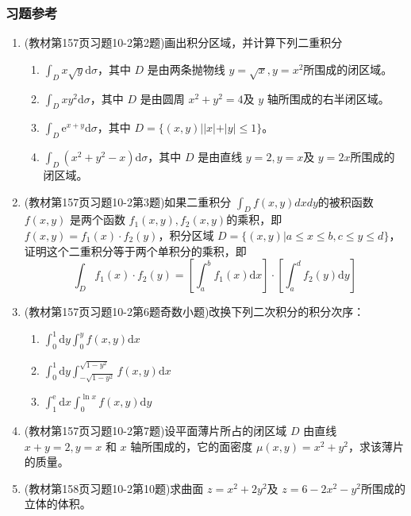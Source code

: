 \subsubsection{习题参考}
\begin{enumerate}
    \item (教材第157页习题10-2第2题)画出积分区域，并计算下列二重积分
    \begin{enumerate}[(1)]
        \item $\int _D x \sqrt{y} \mathrm{d} \sigma$，其中 $D$ 是由两条抛物线 $y=\sqrt{x}, y =x^2$所围成的闭区域。
        \item $\int _D xy^2 \mathrm{d} \sigma$，其中 $D$ 是由圆周 $x^2 + y^2=4$及 $y$ 轴所围成的右半闭区域。
        \item $\int _D \mathrm{e}^{x+y} \mathrm{d} \sigma$，其中 $D = \{ (x,y)||x|+|y| \le 1 \}$。
        \item $\int _D (x^2 + y^2 -x) \mathrm{d} \sigma$，其中 $D$ 是由直线 $y=2, y=x$及 $y=2x$所围成的闭区域。
    \end{enumerate}

    \item (教材第157页习题10-2第3题)如果二重积分 $\int _D f(x,y) dxdy$的被积函数 $f(x,y)$ 是两个函数 $f_1(x,y), f_2(x,y)$的乘积，即 $f(x,y) = f_1(x) \cdot f_2(y)$，积分区域 $D = \{ (x,y) | a \le x \le b, c \le y \le d \}$，证明这个二重积分等于两个单积分的乘积，即
    \[
        \int _D f_1(x) \cdot f_2 (y) = \left[ \int _a^b f_1(x) \mathrm{d} x \right] \cdot \left[ \int _a ^d f_2(y) \mathrm{d} y \right]
    \]

    \item (教材第157页习题10-2第6题奇数小题)改换下列二次积分的积分次序：
    \begin{enumerate}[(1)]
        \item $\int _0^1 \mathrm{d} y \int _0 ^y f(x,y) \mathrm{d} x$
        \item $\int _0^1 \mathrm{d} y \int _{-\sqrt{1-y^2}}^{\sqrt{1-y^2}} f(x,y) \mathrm{d} x$
        \item $\int _1^\mathrm{e} \mathrm{d} x \int _0 ^{\ln x} f(x,y) \mathrm{d}y$
    \end{enumerate}

    \item (教材第157页习题10-2第7题)设平面薄片所占的闭区域 $D$ 由直线 $x+y=2, y=x$ 和 $x$ 轴所围成的，它的面密度 $\mu (x,y) = x^2 + y^2$，求该薄片的质量。

    \item (教材第158页习题10-2第10题)求曲面 $z=x^2 + 2y^2$及 $z=6-2x^2-y^2$所围成的立体的体积。


\end{enumerate}

